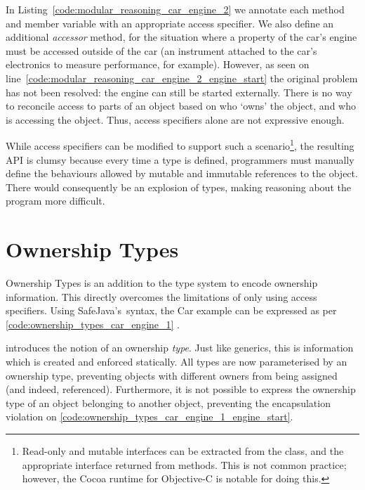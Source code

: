 \documentclass{acm_proc_article-sp}
\begin{document}
In Listing~\ref{code:modular_reasoning_car_engine_2} we annotate each method
and member variable with an appropriate access specifier. We also define an
additional \emph{accessor} method, for the situation where a property of the
car's engine must be accessed outside of the car (an instrument attached to the
car's electronics to measure performance, for example). However, as seen on
line~\ref{code:modular_reasoning_car_engine_2_engine_start} the original
problem has not been resolved: the engine can still be started externally.
There is no way to reconcile access to parts of an object based on who `owns'
the object, and who is accessing the object. Thus, access specifiers alone are
not expressive enough.

While access specifiers can be modified to support such a
scenario\footnote{Read-only and mutable interfaces can be extracted from the
class, and the appropriate interface returned from methods. This is not common
practice; however, the Cocoa runtime for Objective-C is notable for doing
this.}, the resulting API is clumsy because every time a type is defined,
programmers must manually define the behaviours allowed by mutable and
immutable references to the object. There would consequently be an explosion of
types, making reasoning about the program more difficult.

\section{Ownership Types}
\label{sec:ownership}

Ownership Types is an addition to the type system to encode ownership
information. This directly overcomes the limitations of only using access
specifiers. Using SafeJava's\,\cite{boyapati04safejava} syntax, the Car example
can be expressed as per \cref{code:ownership_types_car_engine_1}
.

 introduces the notion of an ownership
\emph{type}. Just like generics, this is information which is created and
enforced statically. All types are now parameterised by an ownership type,
preventing objects with different owners from being assigned (and indeed,
referenced). Furthermore, it is not possible to express the ownership type of
an object belonging to another object, preventing the encapsulation violation
on \cref{code:ownership_types_car_engine_1_engine_start}.
\end{document}
